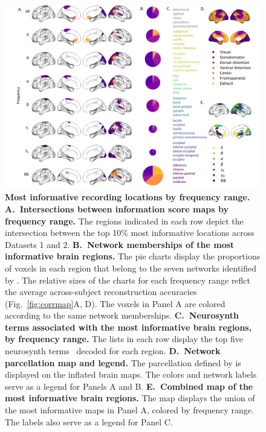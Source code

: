 \documentclass[11pt]{article}
\begin{document}
\begin{figure}
  \centering \includegraphics[width=\textwidth]{figs/networks}
  \caption{\textbf{Most informative recording locations by frequency range.}
  \textbf{A.~Intersections between information score maps by frequency range.}
  The regions indicated in each row depict the intersection between the top 10\%
  most informative locations across Datasets 1 and 2.  \textbf{B.~Network
  memberships of the most informative brain regions.}  The pie charts display
  the proportions of voxels in each region that belong to the seven networks
  identified by \cite{YeoEtal11}.  The relative sizes of the charts for each
  frequency range reflct the average across-subject reconstruction accuracies
  (Fig.~\ref{fig:corrmap}A, D).  The voxels in Panel A are colored according to
  the same network memberships.  \textbf{C.~Neurosynth terms associated with the
  most informative brain regions, by frequency range.}  The lists in each row
  display the top five neurosynth terms~\citep{RubiEtal17} decoded for each
  region.  \textbf{D.~Network parcellation map and legend.}  The parcellation
  defined by \cite{YeoEtal11} is displayed on the inflated brain maps.  The
  colors and network labels serve as a legend for Panels A and B.
  \textbf{E.~Combined map of the most informative brain regions.}  The map
  displays the union of the most informative maps in Panel A, colored by
  frequency range.  The labels also serve as a legend for Panel C.}
  \label{fig:networks}
\end{figure}
\end{document}
